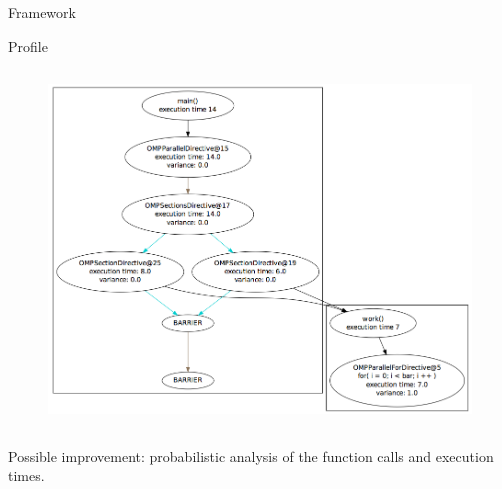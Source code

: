 \documentclass[xcolor=dvipsnames]{beamer}
\begin{document}
\begin{section}{Framework}
\begin{frame}{\hskip 0.3cm Profile}
\begin{columns}
\begin{column}{7.5cm}
\vskip -0.5cm
\begin{figure}
\centering
\includegraphics[scale=0.22]{call_graph.png}

\end{figure}
\end{column}

\end{columns}

Possible improvement: probabilistic analysis of the function calls and execution times.


\end{frame}






\end{section}
\end{document}
